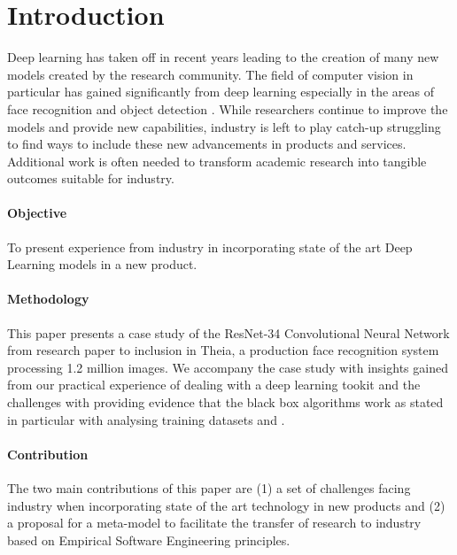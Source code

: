 \section{Introduction}

Deep learning has taken off in recent years leading to the creation of many new models created by the research community. The field of computer vision in particular has gained significantly from deep learning \citep{He:2016ib,Jia:2014cm} especially in the areas of face recognition \citep{Schroff:2015ks} and object detection \citep{Huang:2017wn}. While researchers continue to improve the models and provide new capabilities, industry is left to play catch-up struggling to find ways to include these new advancements in products and services. Additional work is often needed to transform academic research into tangible outcomes suitable for industry.

\paragraph{Objective} To present experience from industry in incorporating state of the art Deep Learning models in a new product.

\paragraph{Methodology} This paper presents a case study of the ResNet-34 Convolutional Neural Network from research paper to inclusion in Theia, a production face recognition system processing 1.2 million images. We accompany the case study with insights gained from our practical experience of dealing with a deep learning tookit \citep{King:2009wp} and the challenges with providing evidence that the black box algorithms work as stated in particular with analysing training datasets \citep{Parkhi:2015de} and \citep{Ng:2014wa}.
 
 \paragraph{Contribution} The two main contributions of this paper are (1) a set of challenges facing industry when incorporating state of the art technology in new products and (2) a proposal for a meta-model to facilitate the transfer of research to industry based on Empirical Software Engineering principles.
 

